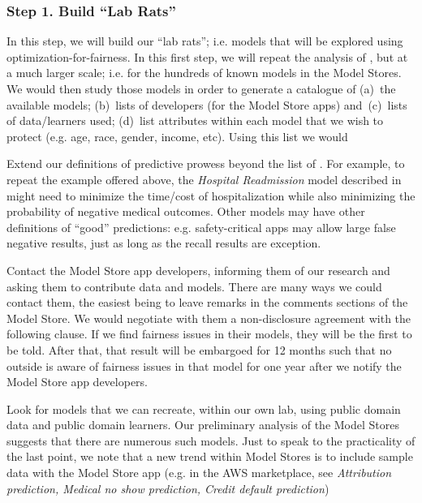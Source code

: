 \subsubsection{Step 1. Build ``Lab Rats''}\label{tion:labrat}
In this step, we will build our  ``lab rats''; i.e. models that will be explored using optimization-for-fairness.
In this first step, we will  repeat the analysis 
of , but at a much larger scale; i.e. for the hundreds of known models
in the Model Stores. 
We would then study those models in order to generate
a catalogue of   (a)~the available models;  (b)~lists of developers (for the Model Store apps) and~(c)~lists of data/learners used; (d)~list attributes within each model that we wish to protect (e.g. age, race, gender, income, etc). 
Using this list we would 
\bi
\item Extend our definitions of predictive prowess beyond the list of .
For example, to repeat the example
offered above,
the  {\em Hospital  Readmission} model described in 
might need to minimize
the time/cost of hospitalization
while also minimizing the probability of negative medical outcomes.
Other models may have other definitions of ``good'' predictions: e.g. safety-critical
apps may allow large false negative results, just as long as the recall results
are exception.
\item
Contact the Model Store app developers, informing them of
our research and asking them to contribute data and models. There are many ways we could contact them,
the easiest being to leave remarks in the comments sections of the Model Store.
We would negotiate with them
a non-disclosure agreement with the following clause.
If we find fairness issues in their models, they will be the first to be told.
After that, that result will be embargoed for 12 months such that no outside
is aware of fairness issues in that model for one year after we notify the Model
Store app developers.
\item
Look for models that we can recreate, within our own lab, using public domain
data and public domain learners. Our preliminary analysis of the Model Stores
suggests that there are numerous such models.
\ei
Just to speak to the practicality of the last point,
we note that  a new trend within  Model Stores
is to include sample data with the Model Store app  (e.g. in the AWS marketplace,
see 
{\em  Attribution prediction, Medical no show prediction, Credit default prediction})
 
 
 \newenvironment{success}[1]{ 
 \vspace{-1mm}
 \centerline\noindent\begin{minipage}{.9\linewidth}
    \begin{center}
    \arrayrulecolor{black}
    \begin{tabular}{|p{0.95\linewidth}|}\hline
         \rowcolor{gray!20}
         {\bf Success criteria for ``#1''}}{
    \\\hline\end{tabular}\end{center}\end{minipage}\vspace{1mm}}
    
